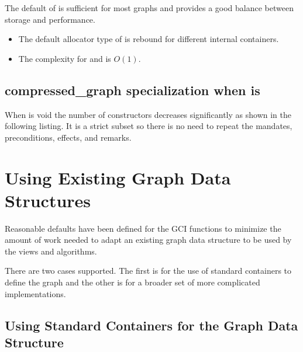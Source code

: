 \begin{itemdescr}
\begin{itemize}
                  The default of  is sufficient for most graphs and provides a good balance between storage and performance.
        \end{itemize}
    \pnum\remarks 
        \begin{itemize}
            \item The default allocator type of  is rebound for different internal containers.
            \item The complexity for  and  is $O(1)$.
        \end{itemize}
\end{itemdescr}

\subsection{compressed\_graph specialization when  is }
When  is void the number of constructors decreases significantly as shown in the following listing.
It is a strict subset so there is no need to repeat the mandates, preconditions, effects, and remarks.

{\small
      
}

\section{Using Existing Graph Data Structures}
Reasonable defaults have been defined for the GCI functions to minimize the amount of work
needed to adapt an existing graph data structure to be used by the views and algorithms.

There are two cases supported. The first is for the use of standard containers to define the graph and the other
is for a broader set of more complicated implementations.

\subsection{Using Standard Containers for the Graph Data Structure}

